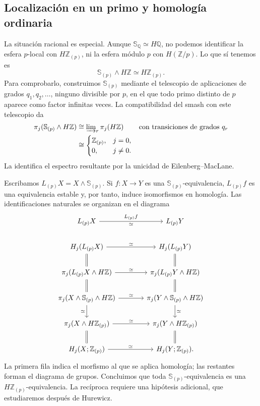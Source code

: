 \subsection{Localización en un primo y homología ordinaria}
La situación racional es especial. Aunque $\mathbb S_{\mathbb Q}\simeq H\mathbb Q$, no podemos identificar la esfera $p$-local con $H\mathbb Z_{(p)}$, ni la esfera módulo $p$ con $H(\mathbb Z/p)$. Lo que sí tenemos es
\[
\mathbb S_{(p)}\wedge H\mathbb Z\simeq H\mathbb Z_{(p)}.
\]
Para comprobarlo, construimos $\mathbb S_{(p)}$ mediante el telescopio de aplicaciones de grados $q_1,q_2,\ldots$, ninguno divisible por $p$, en el que todo primo distinto de $p$ aparece como factor infinitas veces. La compatibilidad del smash con este telescopio da
\begin{align*}
\pi_j(\mathbb S_{(p)}\wedge H\mathbb Z)
&\cong\varinjlim\nolimits_r\pi_j(H\mathbb Z)
&&\text{con transiciones de grados }q_r\\
&\cong
\begin{cases}
\mathbb Z_{(p)},&j=0,\\
0,&j\ne0.
\end{cases}
\end{align*}
La  identifica el espectro resultante por la unicidad de Eilenberg--MacLane.

Escribamos $L_{(p)}X=X\wedge\mathbb S_{(p)}$. Si $f\colon X\to Y$ es una $\mathbb S_{(p)}$-equivalencia, $L_{(p)}f$ es una equivalencia estable y, por tanto, induce isomorfismos en homología. Las identificaciones naturales se organizan en el diagrama
\[
\begin{tikzcd}[column sep=large,row sep=normal]
L_{(p)}X\arrow[r,"L_{(p)}f","\simeq"']&L_{(p)}Y\\
H_j(L_{(p)}X)\arrow[r,"\simeq"]\arrow[d,equal]&H_j(L_{(p)}Y)\arrow[d,equal]\\
\pi_j(L_{(p)}X\wedge H\mathbb Z)\arrow[r,"\simeq"]\arrow[d,equal]
&\pi_j(L_{(p)}Y\wedge H\mathbb Z)\arrow[d,equal]\\
\pi_j(X\wedge\mathbb S_{(p)}\wedge H\mathbb Z)\arrow[r,"\simeq"]\arrow[d,"\simeq"']
&\pi_j(Y\wedge\mathbb S_{(p)}\wedge H\mathbb Z)\arrow[d,"\simeq"]\\
\pi_j(X\wedge H\mathbb Z_{(p)})\arrow[r,"\simeq"]\arrow[d,equal]
&\pi_j(Y\wedge H\mathbb Z_{(p)})\arrow[d,equal]\\
H_j(X;\mathbb Z_{(p)})\arrow[r,"\simeq"]&H_j(Y;\mathbb Z_{(p)}).
\end{tikzcd}
\]
La primera fila indica el morfismo al que se aplica homología; las restantes forman el diagrama de grupos. Concluimos que toda $\mathbb S_{(p)}$-equivalencia es una $H\mathbb Z_{(p)}$-equivalencia. La recíproca requiere una hipótesis adicional, que estudiaremos después de Hurewicz.

